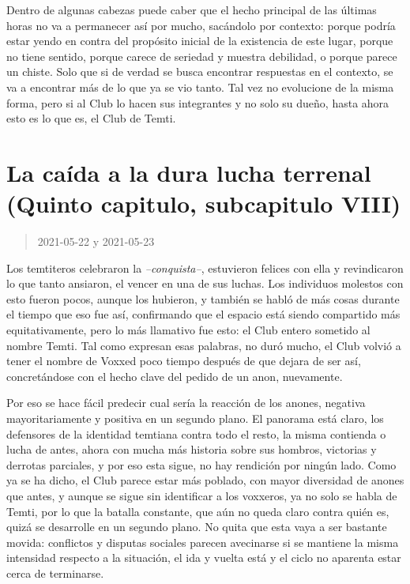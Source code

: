 \documentclass[
  spanish,
]{book}
\begin{document}
Dentro de algunas cabezas puede caber que el hecho principal de las últimas horas no va a permanecer así por mucho, sacándolo por contexto: porque podría estar yendo en contra del propósito inicial de la existencia de este lugar, porque no tiene sentido, porque carece de seriedad y muestra debilidad, o porque parece un chiste. Solo que si de verdad se busca encontrar respuestas en el contexto, se va a encontrar más de lo que ya se vio tanto. Tal vez no evolucione de la misma forma, pero si al Club lo hacen sus integrantes y no solo su dueño, hasta ahora esto es lo que es, el Club de Temti.

\hypertarget{la-cauxedda-a-la-dura-lucha-terrenal-quinto-capitulo-subcapitulo-viii}{%
\section{La caída a la dura lucha terrenal (Quinto capitulo, subcapitulo VIII)}\label{la-cauxedda-a-la-dura-lucha-terrenal-quinto-capitulo-subcapitulo-viii}}

\begin{quote}
2021-05-22 y 2021-05-23
\end{quote}

Los temtiteros celebraron la \emph{--conquista--}, estuvieron felices con ella y revindicaron lo que tanto ansiaron, el vencer en una de sus luchas. Los individuos molestos con esto fueron pocos, aunque los hubieron, y también se habló de más cosas durante el tiempo que eso fue así, confirmando que el espacio está siendo compartido más equitativamente, pero lo más llamativo fue esto: el Club entero sometido al nombre Temti. Tal como expresan esas palabras, no duró mucho, el Club volvió a tener el nombre de Voxxed poco tiempo después de que dejara de ser así, concretándose con el hecho clave del pedido de un anon, nuevamente.

Por eso se hace fácil predecir cual sería la reacción de los anones, negativa mayoritariamente y positiva en un segundo plano. El panorama está claro, los defensores de la identidad temtiana contra todo el resto, la misma contienda o lucha de antes, ahora con mucha más historia sobre sus hombros, victorias y derrotas parciales, y por eso esta sigue, no hay rendición por ningún lado.
Como ya se ha dicho, el Club parece estar más poblado, con mayor diversidad de anones que antes, y aunque se sigue sin identificar a los voxxeros, ya no solo se habla de Temti, por lo que la batalla constante, que aún no queda claro contra quién es, quizá se desarrolle en un segundo plano. No quita que esta vaya a ser bastante movida: conflictos y disputas sociales parecen avecinarse si se mantiene la misma intensidad respecto a la situación, el ida y vuelta está y el ciclo no aparenta estar cerca de terminarse.
\end{document}
